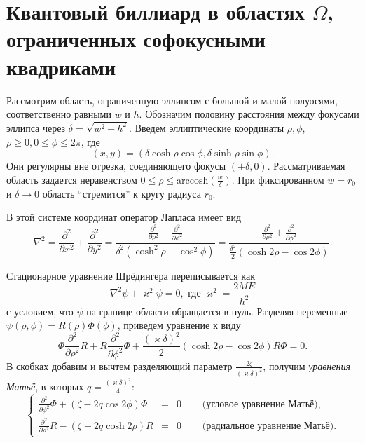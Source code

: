 \section{Квантовый биллиард в областях $\Omega$, ограниченных софокусными квадриками}\label{sec:ch1/sec2}
Рассмотрим область, ограниченную эллипсом с большой и малой полуосями, соответственно равными $w$ и $h$.
Обозначим половину расстояния между фокусами эллипса через  $\delta = \sqrt{w^2 - h^2}$.
Введем эллиптические координаты $\rho, \phi$, $\rho\ge 0, 0\le\phi \le 2\pi$, где 
$$(x, y) = (\delta\cosh{\rho}\cos{\phi}, \delta\sinh{\rho}\sin{\phi}). $$
Они регулярны вне отрезка, соединяющего фокусы $(\pm\delta,0)$.
 Рассматриваемая область задается неравенством $0 \leq \rho \leq \text{arccosh} (\frac{w}{\delta})$. 
При фиксированном $w=r_0$ и  $\delta\to 0$
область ``стремится'' к кругу радиуса $r_0$.
 
 В этой системе координат оператор Лапласа имеет вид
$$\nabla^2 = \frac{\partial^2}{\partial x^2} + \frac{\partial^2}{\partial y^2} = \frac{\frac{\partial^2}{\partial \rho^2} + \frac{\partial^2}{\partial \phi^2}}{\delta^2(\cosh^2{\rho} - \cos^2{\phi})} = 
\frac{\frac{\partial^2}{\partial \rho^2} + \frac{\partial^2}{\partial \phi^2}}{\frac{\delta^2}{2}(\cosh{2\rho} - \cos{2\phi})}.$$

 
Стационарное уравнение Шрёдингера 
переписывается как
$$ \nabla^2 \psi +\varkappa^2\psi =  0, \text{  где  }\varkappa^2 =\frac{2ME}{\hbar^2}$$
с условием, что $\psi$ на границе области обращается в нуль.
Разделяя переменные $\psi(\rho,\phi) = R(\rho)\Phi(\phi)$, приведем уравнение к виду
$$\Phi\frac{\partial^2}{\partial \rho^2}R + R\frac{\partial^2}{\partial \phi^2}\Phi + \frac{(\varkappa \delta)^2}{2}(\cosh{2\rho} - \cos{2\phi})R\Phi = 0. $$
В скобках добавим и вычтем разделяющий параметр $\frac{2\zeta}{(\varkappa \delta)^2}$, получим \textit{уравнения Матьё}, в которых $q=\frac{(\varkappa \delta)^2}{4}$:
\begin{equation}
\left\{
\begin{array}{rcll}

			\frac{\partial^2}{\partial \phi^2}\Phi + (\zeta - 2q\cos{2\phi})\Phi &= &0 \quad 	 &\textit{   (угловое уравнение Матьё)}, \\
		\frac{\partial^2}{\partial \rho^2}R - (\zeta - 2q\cosh{2\rho})R &=& 0 	\quad	& \textit{   (радиальное уравнение Матьё)}.  
\end{array}
\right.
\label{eq:mathieusystem}
\end{equation}



